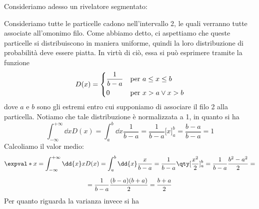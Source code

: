 Consideriamo adesso un rivelatore segmentato:
\begin{figure}[H]
   \centering
\end{figure}
Consideriamo tutte le particelle cadono nell'intervallo 2, le quali verranno tutte associate all'omonimo filo. Come abbiamo detto, ci aspettiamo che queste particelle si distribuiscono in maniera uniforme, quindi la loro distribuzione di probabilità deve essere piatta. In virtù di ciò, essa si può esprimere tramite la funzione
\begin{equation*}
   D(x)=
   \begin{dcases}
      \frac{1}{b-a} & \text{per } a \leq x \leq b\\
      0 & \text{per } x>a \vee x>b\\
   \end{dcases}
\end{equation*}
dove $a$ e $b$ sono gli estremi entro cui supponiamo di associare il filo 2 alla particella. Notiamo che tale distribuzione è normalizzata a 1, in quanto si ha
\begin{equation*}
   \int_{-\infty}^{+\infty} \dd{x} D(x)
   =\int_{a}^{b} \dd{x} \frac{1}{b-a}
   =\frac{1}{b-a} \bigl[ x \bigr]_{a}^{b}
   =\frac{b-a}{b-a}
   =1
\end{equation*}
Calcoliamo il valor medio:
\begin{gather*}
   \expval*{x}
   =\int_{-\infty}^{+\infty} \dd{x} x D(x)
   =\int_{a}^{b} \dd{x} \frac{x}{b-a}
   =\frac{1}{b-a} \qty[ \frac{x^2}{2} ]_{a}^{b}
   =\frac{1}{b-a} \frac{b^2 - a^2}{2}=
   \\[0.2cm]
   =\frac{1}{b-a} \frac{(b - a)(b + a)}{2}
   =\frac{b + a}{2}
\end{gather*}
Per quanto riguarda la varianza invece si ha
